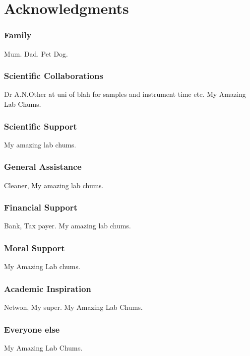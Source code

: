 \chapter*{Acknowledgments}
\subsection*{Family}
Mum. Dad. Pet Dog.

\subsection*{Scientific Collaborations}
Dr A.N.Other at uni of blah for samples and instrument time etc. My Amazing Lab Chums.

\subsection*{Scientific Support}
My amazing lab chums.

\subsection*{General Assistance}
Cleaner, My amazing lab chums.

\subsection*{Financial Support}
Bank, Tax payer. My amazing lab chums.

\subsection*{Moral Support}
My Amazing Lab chums.

\subsection*{Academic Inspiration}
Netwon, My super. My Amazing Lab Chums.

\subsection*{Everyone else}
My Amazing Lab Chums.
